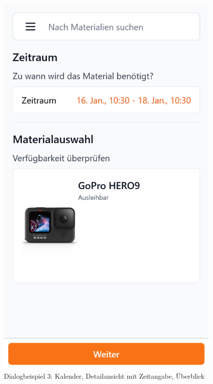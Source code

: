 \begin{figure}[p]
    \includegraphics[scale=0.19]{Bilder/Dialgobeispiel/Falsche Uhrzeit.png}
    \caption{Dialogbeispiel 3: Kalender, Detailansicht mit Zeitangabe, Überblick}\label{fig:datum}
\end{figure}
